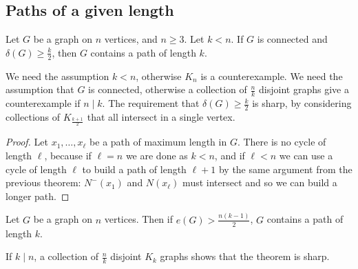 \subsection{Paths of a given length}
\begin{lemma}
	Let \( G \) be a graph on \( n \) vertices, and \( n \geq 3 \).
	Let \( k < n \).
	If \( G \) is connected and \( \delta(G) \geq \frac{k}{2} \), then \( G \) contains a path of length \( k \).
\end{lemma}
\begin{remark}
	We need the assumption \( k < n \), otherwise \( K_n \) is a counterexample.
	We need the assumption that \( G \) is connected, otherwise a collection of \( \frac{n}{k} \) disjoint graphs give a counterexample if \( n \mid k \).
	The requirement that \( \delta(G) \geq \frac{k}{2} \) is sharp, by considering collections of \( K_{\frac{k+1}{2}} \) that all intersect in a single vertex.
\end{remark}
\begin{proof}
	Let \( x_1, \dots, x_\ell \) be a path of maximum length in \( G \).
	There is no cycle of length \( \ell \), because if \( \ell = n \) we are done as \( k < n \), and if \( \ell < n \) we can use a cycle of length \( \ell \) to build a path of length \( \ell + 1 \) by the same argument from the previous theorem: \( N^-(x_1) \) and \( N(x_\ell) \) must intersect and so we can build a longer path.
\end{proof}
\begin{theorem}
	Let \( G \) be a graph on \( n \) vertices.
	Then if \( e(G) > \frac{n(k-1)}{2} \), \( G \) contains a path of length \( k \).
\end{theorem}
\begin{remark}
	If \( k \mid n \), a collection of \( \frac{n}{k} \) disjoint \( K_k \) graphs shows that the theorem is sharp.
\end{remark}
